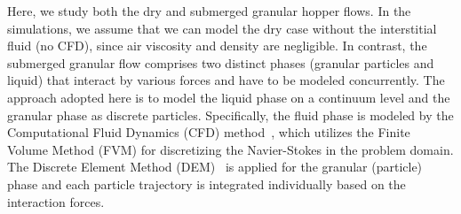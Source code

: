 \documentclass[twoside,twocolumn,9pt]{article}
\begin{document}
Here, we study both the dry and submerged granular hopper flows.
In the simulations, we assume that we can model the dry case without 
the interstitial fluid (no CFD), since  air viscosity and density are 
negligible.
In contrast, the submerged granular flow comprises two distinct 
phases (granular particles and liquid) that interact by various forces 
and have to be modeled concurrently. 
The approach adopted here is to model the liquid phase on a continuum 
level and the granular phase as discrete particles. Specifically, the 
fluid phase is modeled by the Computational Fluid Dynamics (CFD) 
method~\cite{ferziger2012computational}, which utilizes the Finite Volume 
Method (FVM) for discretizing the Navier-Stokes in the problem domain. 
The Discrete Element Method (DEM)~\cite{cundall1979discrete} is applied 
for the granular (particle) phase and each particle trajectory is 
integrated individually based on the interaction forces.
\end{document}
